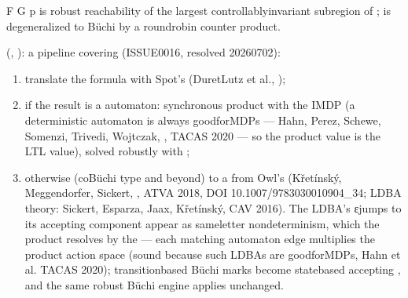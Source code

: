 \documentclass[a4paper,10pt,english]{sphinxmanual}
\begin{document}
\sphinxAtStartPar
{} F G p is robust reachability of the largest controllably\sphinxhyphen{}invariant
sub\sphinxhyphen{}region of ;  is degeneralized to Büchi by a round\sphinxhyphen{}robin counter
product.

\sphinxAtStartPar
{} (, ): a  pipeline covering  (ISSUE\sphinxhyphen{}0016, resolved 2026\sphinxhyphen{}07\sphinxhyphen{}02):
\begin{enumerate}
%
\item {} 
\sphinxAtStartPar
translate the formula with Spot’s  (Duret\sphinxhyphen{}Lutz et al., );

\item {} 
\sphinxAtStartPar
if the result is a  automaton: synchronous
product with the IMDP (a deterministic automaton is always good\sphinxhyphen{}for\sphinxhyphen{}MDPs — Hahn,
Perez, Schewe, Somenzi, Trivedi, Wojtczak, , TACAS 2020 —
so the product value is the LTL value), solved robustly with
;

\item {} 
\sphinxAtStartPar
otherwise (co\sphinxhyphen{}Büchi \sphinxhyphen{}type and beyond)   to a
 from Owl’s  (Křetínský,
Meggendorfer, Sickert, , ATVA 2018,
DOI 10.1007/978\sphinxhyphen{}3\sphinxhyphen{}030\sphinxhyphen{}01090\sphinxhyphen{}4\_34; LDBA theory: Sickert, Esparza, Jaax, Křetínský,
CAV 2016). The LDBA’s ε\sphinxhyphen{}jumps to its accepting component appear as same\sphinxhyphen{}letter
nondeterminism, which the product resolves by the  — each matching
automaton edge multiplies the product action space (sound because such LDBAs are
good\sphinxhyphen{}for\sphinxhyphen{}MDPs, Hahn et al. TACAS 2020); transition\sphinxhyphen{}based Büchi marks become
state\sphinxhyphen{}based accepting , and the same robust Büchi engine applies
unchanged.

\end{enumerate}
\end{document}
